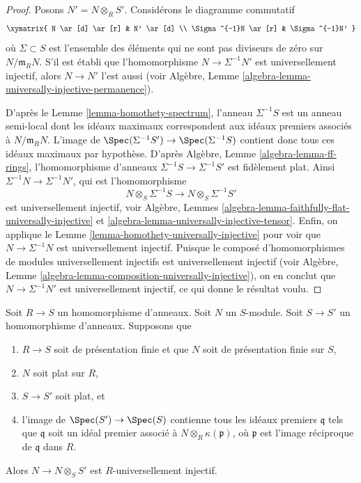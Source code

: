 \begin{proof}
Posons $N' = N \otimes_R S'$. Considérons le diagramme commutatif
$$
\xymatrix{
N \ar[d] \ar[r] & N' \ar[d] \\
\Sigma^{-1}N \ar[r] & \Sigma^{-1}N'
}
$$
où $\Sigma \subset S$ est l'ensemble des éléments qui ne sont pas
diviseurs de zéro sur $N/\mathfrak m_R N$. S'il est établi que l'homomorphisme
$N \to \Sigma^{-1}N'$ est universellement injectif, alors $N \to N'$
l'est aussi (voir
Algèbre, Lemme \ref{algebra-lemma-universally-injective-permanence}).

\medskip\noindent
D'après le
Lemme \ref{lemma-homothety-spectrum},
l'anneau $\Sigma^{-1}S$ est un anneau semi-local dont les idéaux maximaux
correspondent aux idéaux premiers associés à $N/\mathfrak m_R N$.
L'image de
$\Spec(\Sigma^{-1}S') \to \Spec(\Sigma^{-1}S)$
contient donc tous ces idéaux maximaux par hypothèse. D'après
Algèbre, Lemme \ref{algebra-lemma-ff-rings},
l'homomorphisme d'anneaux $\Sigma^{-1}S \to \Sigma^{-1}S'$ est fidèlement plat.
Ainsi $\Sigma^{-1}N \to \Sigma^{-1}N'$, qui est l'homomorphisme
$$
N \otimes_S \Sigma^{-1}S \longrightarrow N \otimes_S \Sigma^{-1}S'
$$
est universellement injectif, voir
Algèbre, Lemmes \ref{algebra-lemma-faithfully-flat-universally-injective} et
\ref{algebra-lemma-universally-injective-tensor}.
Enfin, on applique
le Lemme \ref{lemma-homothety-universally-injective}
pour voir que $N \to \Sigma^{-1}N$ est universellement injectif.
Puisque le composé d'homomorphismes de modules universellement injectifs est universellement
injectif (voir
Algèbre, Lemme \ref{algebra-lemma-composition-universally-injective}),
on en conclut que $N \to \Sigma^{-1}N'$ est universellement injectif, ce qui donne le résultat voulu.
\end{proof}

\begin{lemma}
\label{lemma-base-change-universally-flat}
Soit $R \to S$ un homomorphisme d'anneaux.
Soit $N$ un $S$-module.
Soit $S \to S'$ un homomorphisme d'anneaux.
Supposons que
\begin{enumerate}
\item $R \to S$ soit de présentation finie et que $N$ soit de présentation finie
sur $S$,
\item $N$ soit plat sur $R$,
\item $S \to S'$ soit plat, et
\item l'image de $\Spec(S') \to \Spec(S)$ contienne
tous les idéaux premiers $\mathfrak q$ tels que $\mathfrak q$ soit un idéal premier associé
à $N \otimes_R \kappa(\mathfrak p)$, où $\mathfrak p$ est l'image
réciproque de $\mathfrak q$ dans $R$.
\end{enumerate}
Alors $N \to N \otimes_S S'$ est $R$-universellement injectif.
\end{lemma}


